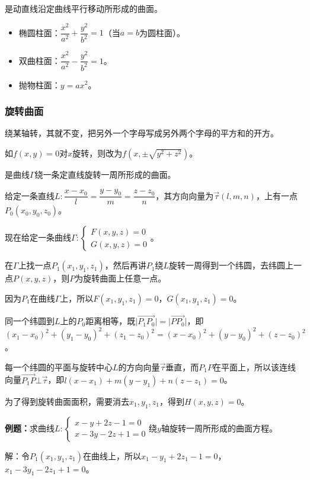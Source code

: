 是动直线沿定曲线平行移动所形成的曲面。

\begin{itemize}
    \item 椭圆柱面：$\dfrac{x^2}{a^2}+\dfrac{y^2}{b^2}=1$（当$a=b$为圆柱面）。
    \item 双曲柱面：$\dfrac{x^2}{a^2}-\dfrac{y^2}{b^2}=1$。
    \item 抛物柱面：$y=ax^2$。
\end{itemize}

\subsubsection{旋转曲面}

绕某轴转，其就不变，把另外一个字母写成另外两个字母的平方和的开方。

如$f(x,y)=0$对$x$旋转，则改为$f(x,\pm\sqrt{y^2+z^2})$。

是曲线$\varGamma$绕一条定直线旋转一周所形成的曲面。

给定一条直线$L:\dfrac{x-x_0}{l}=\dfrac{y-y_0}{m}=\dfrac{z-z_0}{n}$，其方向向量为$\vec{\tau}(l,m,n)$，上有一点$P_0(x_0,y_0,z_0)$。

现在给定一条曲线$\varGamma:\left\{\begin{array}{l}
    F(x,y,z)=0 \\
    G(x,y,z)=0
\end{array}\right.$。

在$\varGamma$上找一点$P_1(x_1,y_1,z_1)$，然后再讲$P_1$绕$L$旋转一周得到一个纬圆，去纬圆上一点$P(x,y,z)$，则$P$为旋转曲面上任意一点。

因为$P_1$在曲线$\varGamma$上，所以$F(x_1,y_1,z_1)=0$，$G(x_1,y_1,z_1)=0$。

同一个纬圆到$L$上的$P_0$距离相等，既$\vert\overrightarrow{P_1P_0}\vert=\vert\overrightarrow{PP_0}\vert$，即$(x_1-x_0)^2+(y_1-y_0)^2+(z_1-z_0)^2=(x-x_0)^2+(y-y_0)^2+(z-z_0)^2$。

每一个纬圆的平面与旋转中心$L$的方向向量$\vec{\tau}$垂直，而$P_1P$在平面上，所以该连线向量$\overrightarrow{P_1P}\bot\vec{\tau}$，即$l(x-x_1)+m(y-y_1)+n(z-z_1)=0$。

为了得到旋转曲面面积，需要消去$x_1,y_1,z_1$，得到$H(x,y,z)=0$。

\textbf{例题：}求曲线$L:\left\{\begin{array}{l}
    x-y+2z-1=0 \\
    x-3y-2z+1=0
\end{array}\right.$绕$y$轴旋转一周所形成的曲面方程。

解：令$P_1(x_1,y_1,z_1)$在曲线上，所以$x_1-y_1+2z_1-1=0$，$x_1-3y_1-2z_1+1=0$。

